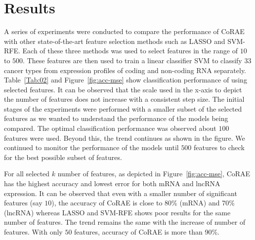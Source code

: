 \documentclass{bioinfo}
\begin{document}
\section{Results}
A series of experiments were conducted to compare the performance of CoRAE with other state-of-the-art feature selection methods such as LASSO and SVM-RFE.
Each of these three methods was used to select features in the range of $10$ to $500$.
These features are then used to train a linear classifier SVM to classify 33 cancer types from expression profiles of coding and non-coding RNA separately. 
Table~\ref{Tab:02} and Figure~\ref{fig:acc-mse} show classification performance of using selected features. It can be observed that the scale used in the x-axis to depict the number of features does not increase with a consistent step size.
The initial stages of the experiments were performed with a smaller subset of the selected features as we wanted to understand the performance of the models being compared.
The optimal classification performance was observed about $100$ features were used.
Beyond this, the trend continues as shown in the figure. We continued to monitor the performance of the models until $500$ features to check for the best possible subset of features. 

For all selected $k$ number of features, as depicted in Figure~\ref{fig:acc-mse}, CoRAE has the highest accuracy and lowest error for both mRNA and lncRNA expression.
It can be observed that even with a smaller number of significant features (say $10$), the accuracy of CoRAE is close to 80\% (mRNA) and 70\% (lncRNA) whereas LASSO and SVM-RFE shows poor results for the same number of features.
The trend remains the same with the increase of number of features. With only $50$ features, accuracy of CoRAE is more than 90\%.
\end{document}
